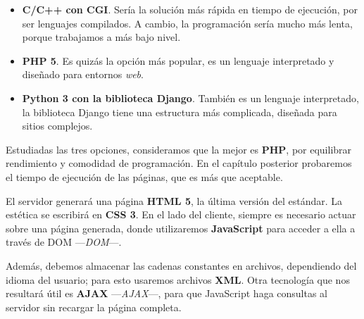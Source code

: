 \begin{itemize}
	\item \textbf{C/C++ con \acrshort{CGI}}. Sería la solución más rápida en tiempo de ejecución, por ser lenguajes compilados. A cambio, la programación sería mucho más lenta, porque trabajamos a más bajo nivel.
	
	\item \textbf{\acrshort{PHP} 5}. Es quizás la opción más popular, es un lenguaje interpretado y diseñado para entornos \textit{web}.
	
	\item \textbf{Python 3 con la biblioteca Django}. También es un lenguaje interpretado, la biblioteca Django tiene una estructura más complicada, diseñada para sitios complejos.
\end{itemize}

Estudiadas las tres opciones, consideramos que la mejor es \textbf{\acrshort{PHP}}, por equilibrar rendimiento y comodidad de programación. En el capítulo posterior probaremos el tiempo de ejecución de las páginas, que es más que aceptable.

El servidor generará una página \textbf{\acrshort{HTML} 5}, la última versión del estándar. La estética se escribirá en \textbf{\acrshort{CSS} 3}. En el lado del cliente, siempre es necesario actuar sobre una página generada, donde utilizaremos \textbf{JavaScript} para acceder a ella a través de \acrshort{DOM} ---\textit{\acrlong{DOM}}---.

Además, debemos almacenar las cadenas constantes en archivos, dependiendo del idioma del usuario; para esto usaremos archivos \textbf{\acrshort{XML}}. Otra tecnología que nos resultará útil es \textbf{\acrshort{AJAX}} ---\textit{\acrlong{AJAX}}---, para que JavaScript haga consultas al servidor sin recargar la página completa.

\smallskip


